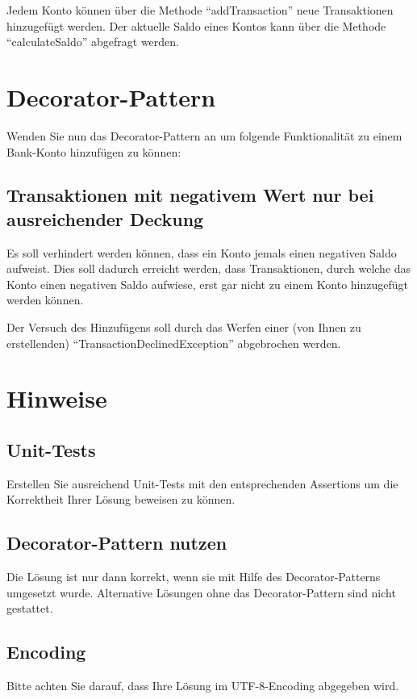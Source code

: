 \documentclass[oneside,a4paper]{scrartcl}
\begin{document}
Jedem Konto können über die Methode \enquote{addTransaction} neue Transaktionen hinzugefügt werden.
Der aktuelle Saldo eines Kontos kann über die Methode \enquote{calculateSaldo} abgefragt werden.



\section{Decorator-Pattern}
Wenden Sie nun das Decorator-Pattern an um folgende Funktionalität zu einem Bank-Konto hinzufügen zu können:

\subsection{Transaktionen mit negativem Wert nur bei ausreichender Deckung}
Es soll verhindert werden können, dass ein Konto jemals einen negativen Saldo aufweist.
Dies soll dadurch erreicht werden, dass Transaktionen, durch welche das Konto einen negativen Saldo aufwiese,
erst gar nicht zu einem Konto hinzugefügt werden können.

Der Versuch des Hinzufügens soll durch das Werfen einer (von Ihnen zu erstellenden) 
\enquote{TransactionDeclinedException} abgebrochen werden.



\section*{Hinweise}
\subsection*{Unit-Tests}
Erstellen Sie ausreichend Unit-Tests mit den entsprechenden Assertions um die Korrektheit Ihrer Lösung
beweisen zu können.

\subsection*{Decorator-Pattern nutzen}
Die Lösung ist nur dann korrekt, wenn sie mit Hilfe des Decorator-Patterns umgesetzt wurde. Alternative Lösungen
ohne das Decorator-Pattern sind nicht gestattet. 

\subsection*{Encoding}
Bitte achten Sie darauf, dass Ihre Lösung im UTF-8-Encoding abgegeben wird.
\end{document}
